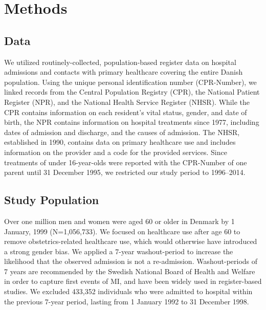 


\section{Methods}

\subsection{Data}
We utilized routinely-collected, population-based register data on hospital 
admissions and contacts with primary healthcare covering the entire Danish 
population. Using the unique personal identification number (CPR-Number), 
we linked records from the Central Population Registry (CPR), the National 
Patient Register (NPR), and the National Health Service Register (NHSR). 
While the CPR contains information on each resident's vital status, gender, 
and date of birth,\citep{pedersen2011,schmidt2014} the NPR contains 
information on hospital treatments since 1977, including dates of admission 
and discharge, and the causes of admission.\citep{lynge2011} The NHSR, 
established in 1990, contains data on primary healthcare use and includes 
information on the provider and a code for the provided services.\citep{sahl2011danish} 
Since treatments of under 16-year-olds were reported with the CPR-Number 
of one parent until 31 December 1995, we restricted our study period to 
1996--2014.\\

\subsection{Study Population}
Over one million men and women were aged 60 or older in Denmark by 1 January, 
1999 (N=1,056,733). We focused on healthcare use after age 60 to remove 
obstetrics-related healthcare use, which would otherwise have introduced 
a strong gender bias. We applied a 7-year washout-period to increase the 
likelihood that the observed admission is not a re-admission. Washout-periods 
of 7 years are recommended by the Swedish National Board of Health and Welfare 
in order to capture first events of MI,\citep{national2011myocardial} and 
have been widely used in register-based studies.\citep{karampampa2013trends,
modig2017estimating} We excluded 433,352 individuals who were admitted to 
hospital within the previous 7-year period, lasting from 1 January 1992 to 
31 December 1998.

